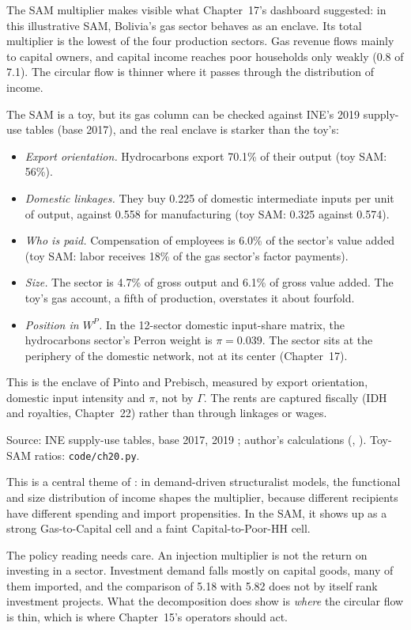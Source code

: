\documentclass[../structural_economics_book.tex]{subfiles}
\begin{document}
\begin{prebisch}
The SAM multiplier makes visible what Chapter~17's dashboard suggested: in this illustrative SAM, Bolivia's gas sector behaves as an enclave. Its total multiplier is the lowest of the four production sectors. Gas revenue flows mainly to capital owners, and capital income reaches poor households only weakly (0.8 of 7.1). The circular flow is thinner where it passes through the distribution of income.

The SAM is a toy, but its gas column can be checked against INE's 2019 supply-use tables (base 2017), and the real enclave is starker than the toy's:
\begin{itemize}
\item \emph{Export orientation.} Hydrocarbons export 70.1\% of their output (toy SAM: 56\%).
\item \emph{Domestic linkages.} They buy 0.225 of domestic intermediate inputs per unit of output, against 0.558 for manufacturing (toy SAM: 0.325 against 0.574).
\item \emph{Who is paid.} Compensation of employees is 6.0\% of the sector's value added (toy SAM: labor receives 18\% of the gas sector's factor payments).
\item \emph{Size.} The sector is 4.7\% of gross output and 6.1\% of gross value added. The toy's gas account, a fifth of production, overstates it about fourfold.
\item \emph{Position in $W^P$.} In the 12-sector domestic input-share matrix, the hydrocarbons sector's Perron weight is $\pi = 0.039$. The sector sits at the periphery of the domestic network, not at its center (Chapter~17).
\end{itemize}
This is the enclave of Pinto and Prebisch, measured by export orientation, domestic input intensity and $\pi$, not by $\Gamma$. The rents are captured fiscally (IDH and royalties, Chapter~22) rather than through linkages or wages. \par{\footnotesize Source: INE supply-use tables, base 2017, 2019 \citep{ine2026sut}; author's calculations (, ). Toy-SAM ratios: \texttt{code/ch20.py}.\par}

This is a central theme of \citet{taylor1983structuralist}: in demand-driven structuralist models, the functional and size distribution of income shapes the multiplier, because different recipients have different spending and import propensities. In the SAM, it shows up as a strong Gas-to-Capital cell and a faint Capital-to-Poor-HH cell.

The policy reading needs care. An injection multiplier is not the return on investing in a sector. Investment demand falls mostly on capital goods, many of them imported, and the comparison of 5.18 with 5.82 does not by itself rank investment projects. What the decomposition does show is \emph{where} the circular flow is thin, which is where Chapter~15's operators should act.
\end{prebisch}
\end{document}
